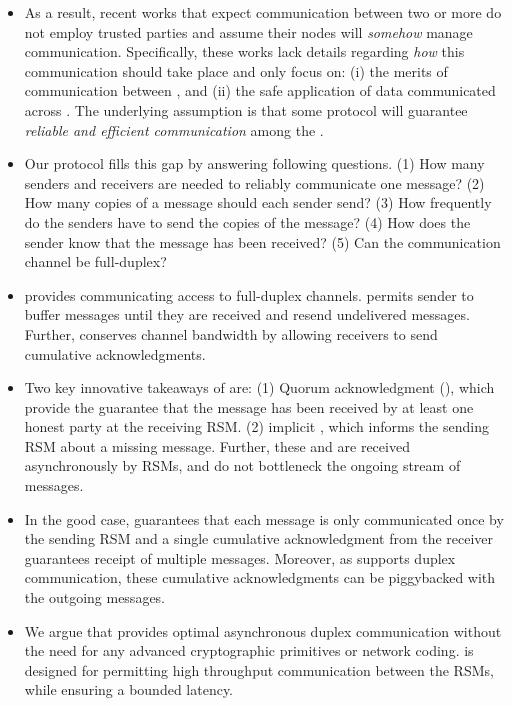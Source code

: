 \begin{itemize}
\item As a result, recent works that expect communication between two or more  
do not employ trusted parties and assume their nodes will {\em somehow} manage communication. 
Specifically, these works lack details regarding {\em how} this communication should take place 
and only focus on:
(i) the merits of communication between , and 
(ii) the safe application of data communicated across . 
The underlying assumption is that some protocol will guarantee {\em reliable and efficient communication} 
among the .

\item Our protocol \Shadow{} fills this gap by answering following questions.
(1) How many senders and receivers are needed to reliably communicate one message? 
(2) How many copies of a message should each sender send?
(3) How frequently do the senders have to send the copies of the message?
(4) How does the sender know that the message has been received?
(5) Can the communication channel be full-duplex?

\item \Shadow{} provides communicating  access to full-duplex channels.
\Shadow{} permits sender to buffer messages until they are received and 
resend undelivered messages.
Further, \Shadow{} conserves channel bandwidth by allowing receivers to send cumulative acknowledgments.

\item Two key innovative takeaways of \Shadow{} are:
(1) Quorum acknowledgment (\quack{}), which provide the guarantee that the message has been received by 
at least one honest party at the receiving RSM.
(2) implicit \duck{}, which informs the sending RSM about a missing message. 
Further, these  and  are received asynchronously by RSMs, and 
do not bottleneck the ongoing stream of messages.
 
\item In the good case, \Shadow{} guarantees that each message is only communicated once by the 
sending RSM and a single cumulative acknowledgment from the receiver guarantees receipt of 
multiple messages.
Moreover, as \Shadow{} supports duplex communication, these cumulative acknowledgments can be piggybacked  
with the outgoing messages.

\item We argue that \Shadow{} provides optimal asynchronous duplex communication without the 
need for any advanced cryptographic primitives or network coding.
\Shadow{} is designed for permitting high throughput communication between the RSMs, while ensuring a bounded latency.

\end{itemize}
